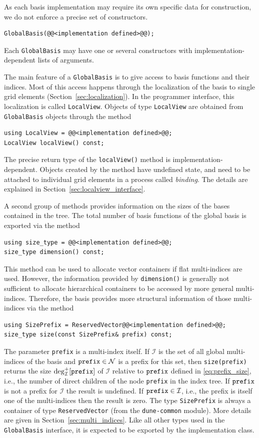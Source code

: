 \documentclass[a4paper,10pt,headings=normal,bibliography=totoc]{scrartcl}
\newcommand{\cpp}[1]{\lstinline[basicstyle=\ttfamily]!#1!}
\newcommand{\dunemodule}[1]{\texttt{#1}}
\begin{document}
As each basis implementation may require its own specific data for construction,
we do not enforce a precise set of constructors.
\begin{lstlisting}[style=Interface]
GlobalBasis(@@<implementation defined>@@);
\end{lstlisting}
Each \cpp{GlobalBasis} may have
one or several constructors with implementation-dependent lists of arguments.

The main feature of a \cpp{GlobalBasis} is to give access to basis functions and their indices.
Most of this access happens through the localization of the basis to single grid elements (Section~\ref{sec:localization}).
In the programmer interface, this localization is called \cpp{LocalView}.  Objects of type
\cpp{LocalView} are obtained from \cpp{GlobalBasis} objects through the method
\begin{lstlisting}[style=Interface]
using LocalView = @@<implementation defined>@@;
LocalView localView() const;
\end{lstlisting}
The precise return type of the \cpp{localView()} method is implementation-dependent. Objects
created by the method have undefined state, and need to be attached to individual grid
elements in a process called \emph{binding}.
The details are explained in Section~\ref{sec:localview_interface}.

A second group of methods provides information on the sizes of the bases
contained in the tree.
The total number of basis functions of the global basis is
exported via the method
\begin{lstlisting}[style=Interface]
using size_type = @@<implementation defined>@@;
size_type dimension() const;
\end{lstlisting}
This method can be used to allocate vector containers if flat multi-indices are used.
However, the information provided by \cpp{dimension()} is generally not
sufficient to allocate hierarchical containers to be
accessed by more general multi-indices.
Therefore, the basis provides more structural
information of those multi-indices via the method
\begin{lstlisting}[style=Interface]
using SizePrefix = ReservedVector@@<implementation defined>@@;
size_type size(const SizePrefix& prefix) const;
\end{lstlisting}
The parameter \cpp{prefix} is a multi-index itself.
If $\mathcal{I}$ is the set of all global multi-indices of the
basis and $\text{\cpp{prefix}} \in \mathcal{N}$ is a prefix for this set, then
\cpp{size(prefix)} returns the size $\operatorname{deg}^+_{\mathcal{I}}[\text{\cpp{prefix}}]$ of
$\mathcal{I}$ relative to $\text{\cpp{prefix}}$ defined in \eqref{eq:prefix_size},
i.e., the number of direct children of the node \cpp{prefix} in the index tree.
If $\text{\cpp{prefix}}$ is not a prefix for $\mathcal{I}$ the result is undefined.
If $\text{\cpp{prefix}} \in \mathcal{I}$, i.e., the prefix is itself one of the multi-indices
then the result is zero.
The type \cpp{SizePrefix} is always a container of type \cpp{ReservedVector} (from the
\dunemodule{dune-common} module).  More details are given in Section~\ref{sec:multi_indices}.
Like all other types used in the \cpp{GlobalBasis} interface, it is expected to be
exported by the implementation class.
\end{document}
